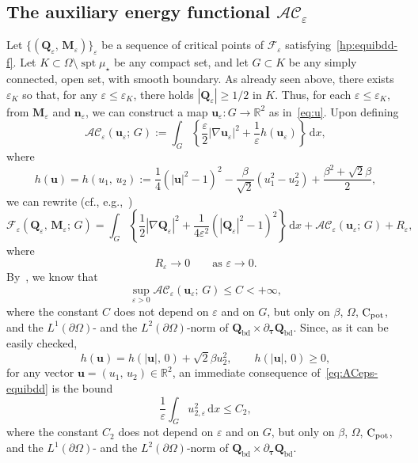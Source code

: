 \documentclass[a4paper, 11pt, twoside, leqno]{article}
\theoremstyle{definition}              %
\theoremstyle{remark}                  %
\DeclareMathOperator{\spt}{spt}                                     %
\newcommand{\abs}[1]{\left| #1 \right|}                             %
\renewcommand{\d}{\mathrm{d}}
\newcommand{\R}{\mathbb{R}}
\newcommand{\Q}{\mathbf{Q}}
\newcommand{\M}{\mathbf{M}}
\newcommand{\n}{\mathbf{n}}
\renewcommand{\u}{\mathbf{u}}
\newcommand{\F}{\mathscr{F}}
\newcommand{\eps}{\varepsilon}
\newcommand{\Cpot}{{\rm C}_{\rm pot}}
\newcommand{\ttau}{{\boldsymbol{\tau}}}
\newcommand{\Qb}{\Q_{\mathrm{bd}}}
\begin{document}
\subsection{The auxiliary energy functional $\mathcal{AC}_\eps$}
\label{sec:ACeps}
Let $\{(\Q_\eps,\,\M_\eps)\}_\eps$ be a sequence of critical points 
of $\F_\eps$ satisfying~\eqref{hp:equibdd-f}. 
Let $K \subset \Omega \setminus \spt \mu_\star$ be any compact set, 
and let $G \subset K$ be any simply connected, open set, with smooth boundary. 
As already seen above, there exists $\eps_K$ so that, 
for any $\eps \leq \eps_K$, there holds $\abs{\Q_\eps} \geq 1/2$ in $K$. 
Thus, for each $\eps \leq \eps_K$, from $\M_\eps$ and $\n_\eps$, we can construct a map $\u_\eps : G \to \R^2$ as in~\eqref{eq:u}. Upon defining 
\begin{equation}\label{eq:ACeps}
    \mathcal{AC}_\eps(\u_\eps;\,G) := \int_G \left\{ \frac{\eps}{2}\abs{\nabla \u_\eps}^2 + \frac{1}{\eps} h(\u_\eps) \right\}\,{\d}x,
\end{equation}
where
\begin{equation}\label{eq:h}
    h(\u) = h(u_1,\,u_2)  := \frac{1}{4}\left( \abs{\u}^2 - 1 \right)^2 - \frac{\beta}{\sqrt{2}}\left( u_1^2 - u_2^2 \right) + \frac{\beta^2 + \sqrt{2}\beta}{2},
\end{equation}
we can rewrite (cf., e.g.,~\cite[Proposition~3.2]{CMSW})
\[
    \F_\eps(\Q_\eps,\,\M_\eps;\,G) = 
    \int_G \left\{ \frac{1}{2} \abs{\nabla \Q_\eps}^2 + \frac{1}{4\eps^2}\left( \abs{\Q_\eps}^2 - 1  \right)^2\right\}\,{\d}x 
    + \mathcal{AC_\eps}(\u_\eps;\,G) 
    + R_\eps,
\]
where
\[
	R_\eps \to 0 \qquad \mbox{as } \eps \to 0.
\]
By~\cite[Lemma~3.2]{CDS1}, we know that
\begin{equation}\label{eq:ACeps-equibdd}
    \sup_{\eps > 0} \mathcal{AC}_\eps(\u_\eps;\,G) \leq C < +\infty,
\end{equation}
where the constant $C$ does not depend on $\eps$ and on $G$, but 
only on $\beta$, $\Omega$, $\Cpot$, and the $L^1(\partial\Omega)$- 
and the $L^2(\partial\Omega)$-norm of $\Qb \times \partial_\ttau \Qb$. 
Since, as it can be easily checked,  
\[
    h(\u) = h(\abs{\u},\,0) + \sqrt{2}\beta u_2^2, \qquad h(\abs{\u},\,0) \geq 0, 
\]
for any vector $\u = (u_1,\,u_2) \in \R^2$, 
an immediate consequence of~\eqref{eq:ACeps-equibdd} is the bound
\begin{equation}\label{eq:decay-u2-basic}
    \frac{1}{\eps}\int_G u_{2,\eps}^2 \,{\d}x \leq C_2,
\end{equation}
where the constant $C_2$ does not depend on $\eps$ and on $G$, but 
only on $\beta$, $\Omega$, $\Cpot$, and the $L^1(\partial\Omega)$- 
and the $L^2(\partial\Omega)$-norm of $\Qb \times \partial_\ttau \Qb$. 
\end{document}
